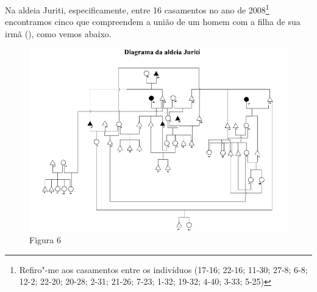 Na aldeia Juriti, especificamente, entre 16 casamentos no ano de
2008\footnote{Refiro"-me aos casamentos entre os indivíduos (17-16;
  22-16; 11-30; 27-8; 6-8; 12-2; 22-20; 20-28; 2-31; 21-26; 7-23; 1-32;
  19-32; 4-40; 3-33; 5-25)} encontramos cinco que compreendem a união de
um homem com a filha de sua irmã (), como vemos abaixo.



\begin{figure}[H]
\centering
  \includegraphics[width=\textwidth]{./imgs/Figura_6}
\caption{Figura 6}
\end{figure}


